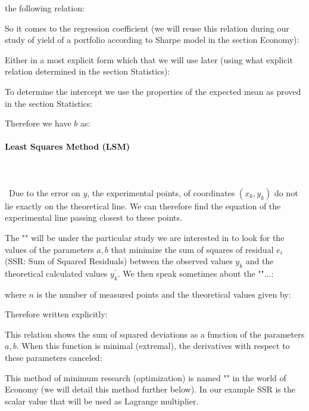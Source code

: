 	the following relation:
	
	So it comes to the regression coefficient (we will reuse this relation during our study of yield of a portfolio according to Sharpe model in the section Economy):
	
	Either in a most explicit form which that we will use later (using what explicit relation determined in the section Statistics):
	
	To determine the intercept we use the properties of the expected mean as proved in the section Statistics:
	
	Therefore we have $b$ as:
	
	
	\paragraph{Least Squares Method (LSM)}\label{least squares method}\mbox{}\\\\\
	Due to the error on $y$, the experimental points, of coordinates $(x_k,y_k)$ do not lie exactly on the theoretical line. We can therefore find the equation of the experimental  line passing closest to these points.
	
	The "" will be under the particular study we are interested in to look for the values of the parameters $a, b$ that minimize the sum of squares of residual $e_i$ (SSR: Sum of Squared Residuals) between the observed values $y_k$ and the theoretical calculated values $y_k^{'}$. We then speak sometimes about the ""...:
	
	where $n$ is the number of measured points and the theoretical values given by:
	
	Therefore written explicitly:
	
	This relation shows the sum of squared deviations as a function of the parameters $a, b$. When this function is minimal (extremal), the derivatives with respect to these parameters canceled:
	
	
	\begin{tcolorbox}[title=Remark,colframe=black,arc=10pt]
This method of minimum research (optimization) is named "" in the world of Economy (we will detail this method further below). In our example SSR is the scalar value that will be used as Lagrange multiplier.
	\end{tcolorbox}	
	
